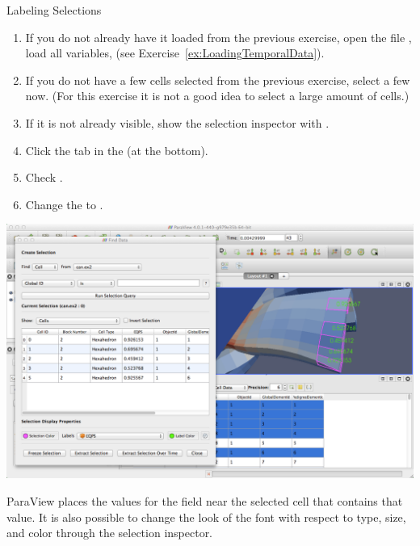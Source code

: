 
\begin{exercise}{Labeling Selections}
  \label{ex:LabelingSelections}%
  \begin{enumerate}
  \item If you do not already have it loaded from the previous exercise,
    open the file , load all variables, \apply (see
    Exercise~\ref{ex:LoadingTemporalData}).
  \item If you do not have a few cells selected from the previous exercise,
    select a few now. (For this exercise it is not a good idea to select a
    large amount of cells.)
  \item If it is not already visible, show the selection inspector
    with  \ra {}.
  \item Click the  tab in the  (at
    the bottom).
  \item Check .
  \item Change the  to .
  \end{enumerate}

  \begin{inlinefig}
    \includegraphics[width=\scw]{images/SpreadsheetSelection}
  \end{inlinefig}

  ParaView places the values for the  field near the selected
  cell that contains that value.  It is also possible to change the look of
  the font with respect to type, size, and color through the selection
  inspector.
\end{exercise}



